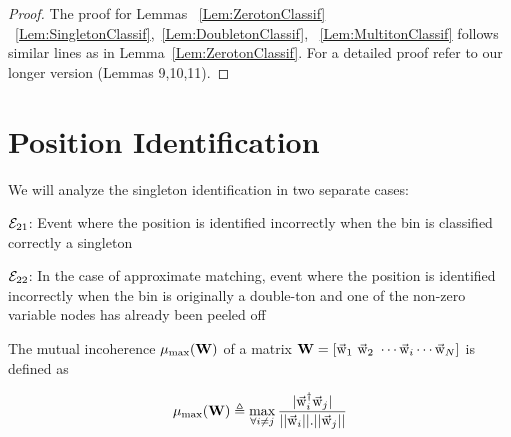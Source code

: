 \begin{proof}
	The proof for Lemmas  ~\ref{Lem:ZerotonClassif} ~\ref{Lem:SingletonClassif},~\ref{Lem:DoubletonClassif}, ~\ref{Lem:MultitonClassif} follows similar lines as in Lemma~\ref{Lem:ZerotonClassif}. For a detailed proof refer to our longer version \cite{janakiraman2017sub} (Lemmas 9,10,11).
\end{proof}
\section{Position Identification}
\label{Append:PositionIdentif}
We will analyze the singleton identification in two separate cases:

$\mathcal{E}_{21}$: Event where the position is identified incorrectly when the bin is classified  correctly a singleton

$\mathcal{E}_{22}$: In the case of approximate matching, event where the position is identified incorrectly when the bin is originally a double-ton and one of the non-zero variable nodes has already been peeled off

\begin{definition}
	The mutual incoherence $\mu_{\text{max}}( \mathbf{W})$ of a matrix $\mathbf{W} = [\vec{\mathrm{w}}_1 ~ \vec{\mathrm{w}}_2 ~ \cdots \vec{\mathrm{w}}_i \cdots \vec{\mathrm{w}}_N ]$ is defined as 
	
	\[\mu_{\text{max}}(\mathbf{W}) \triangleq \max \limits_{\forall i \neq j} \frac{|\vec{\mathrm{w}}_i^{\dagger} \vec{\mathrm{w}}_j |}{||\vec{\mathrm{w}}_i || . ||\vec{\mathrm{w}}_j ||} \]
\end{definition}

